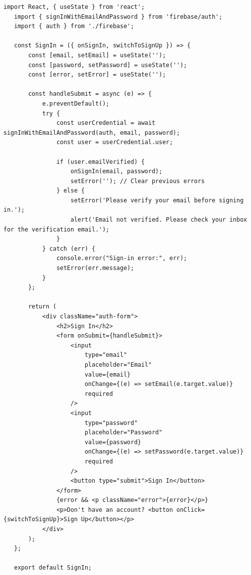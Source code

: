 \documentclass[12pt,a4paper]{report}
\begin{document}
\begin{lstlisting}[caption=Frontend Code Snippet]
   import React, { useState } from 'react';
   import { signInWithEmailAndPassword } from 'firebase/auth';
   import { auth } from './firebase';
   
   const SignIn = ({ onSignIn, switchToSignUp }) => {
       const [email, setEmail] = useState('');
       const [password, setPassword] = useState('');
       const [error, setError] = useState('');
   
       const handleSubmit = async (e) => {
           e.preventDefault();
           try {
               const userCredential = await signInWithEmailAndPassword(auth, email, password);
               const user = userCredential.user;
   
               if (user.emailVerified) {
                   onSignIn(email, password);
                   setError(''); // Clear previous errors
               } else {
                   setError('Please verify your email before signing in.');
                   alert('Email not verified. Please check your inbox for the verification email.');
               }
           } catch (err) {
               console.error("Sign-in error:", err);
               setError(err.message);
           }
       };
   
       return (
           <div className="auth-form">
               <h2>Sign In</h2>
               <form onSubmit={handleSubmit}>
                   <input 
                       type="email" 
                       placeholder="Email" 
                       value={email} 
                       onChange={(e) => setEmail(e.target.value)} 
                       required 
                   />
                   <input 
                       type="password" 
                       placeholder="Password" 
                       value={password} 
                       onChange={(e) => setPassword(e.target.value)} 
                       required 
                   />
                   <button type="submit">Sign In</button>
               </form>
               {error && <p className="error">{error}</p>}
               <p>Don't have an account? <button onClick={switchToSignUp}>Sign Up</button></p>
           </div>
       );
   };
   
   export default SignIn;
   
   \end{lstlisting}
\end{document}
